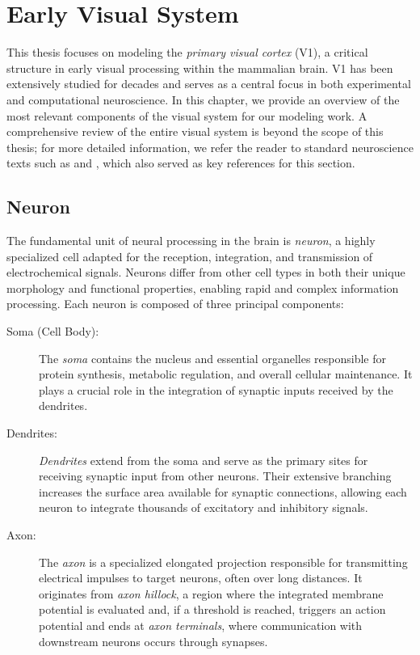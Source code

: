 \chapter{Early Visual System}
\label{chap:visual_system}
This thesis focuses on modeling the \emph{primary visual cortex} (V1), a critical structure in early visual processing within the mammalian brain. V1 has been extensively studied for decades \citep{hubel1965receptive} and serves as a central focus in both experimental and computational neuroscience. In this chapter, we provide an overview of the most relevant components of the visual system for our modeling work. A comprehensive review of the entire visual system is beyond the scope of this thesis; for more detailed information, we refer the reader to standard neuroscience texts such as \citet{bear2020neuroscience} and \citet{goebel2004visual}, which also served as key references for this section.

\section{Neuron}
\label{sec:neuron}

The fundamental unit of neural processing in the brain is \emph{neuron}, a highly specialized cell adapted for the reception, integration, and transmission of electrochemical signals. Neurons differ from other cell types in both their unique morphology and functional properties, enabling rapid and complex information processing. Each neuron is composed of three principal components:

\begin{description}
    \item[Soma (Cell Body):] The \emph{soma} contains the nucleus and essential organelles responsible for protein synthesis, metabolic regulation, and overall cellular maintenance. It plays a crucial role in the integration of synaptic inputs received by the dendrites.

    \item[Dendrites:] \emph{Dendrites} extend from the soma and serve as the primary sites for receiving synaptic input from other neurons. Their extensive branching increases the surface area available for synaptic connections, allowing each neuron to integrate thousands of excitatory and inhibitory signals.

    \item[Axon:] The \emph{axon} is a specialized elongated projection responsible for transmitting electrical impulses to target neurons, often over long distances. It originates from \emph{axon hillock}, a region where the integrated membrane potential is evaluated and, if a threshold is reached, triggers an action potential and ends at \emph{axon terminals}, where communication with downstream neurons occurs through synapses.
\end{description}

